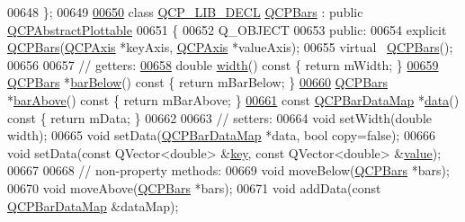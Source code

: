 \begin{DoxyCode}
00648 \};
00649 
\hypertarget{a00116_source_l00650}{}\hyperlink{a00027}{00650} \textcolor{keyword}{class }\hyperlink{a00116_a5eaab02224a642ded7fb8951e973a02c}{QCP\_LIB\_DECL} \hyperlink{a00027}{QCPBars} : \textcolor{keyword}{public} \hyperlink{a00024}{QCPAbstractPlottable}
00651 \{
00652   Q\_OBJECT
00653 \textcolor{keyword}{public}:
00654   \textcolor{keyword}{explicit} \hyperlink{a00027}{QCPBars}(\hyperlink{a00025}{QCPAxis} *keyAxis, \hyperlink{a00025}{QCPAxis} *valueAxis);
00655   \textcolor{keyword}{virtual} ~\hyperlink{a00027}{QCPBars}();
00656   
00657   \textcolor{comment}{// getters:}
\hypertarget{a00116_source_l00658}{}\hyperlink{a00027_a42798c38abd5f5db22bd45d77f429625}{00658}   \textcolor{keywordtype}{double} \hyperlink{a00027_a42798c38abd5f5db22bd45d77f429625}{width}()\textcolor{keyword}{ const }\{ \textcolor{keywordflow}{return} mWidth; \}
\hypertarget{a00116_source_l00659}{}\hyperlink{a00027_a2c46a686cbad95f180ca3c2e88263961}{00659}   \hyperlink{a00027}{QCPBars} *\hyperlink{a00027_a2c46a686cbad95f180ca3c2e88263961}{barBelow}()\textcolor{keyword}{ const }\{ \textcolor{keywordflow}{return} mBarBelow; \}
\hypertarget{a00116_source_l00660}{}\hyperlink{a00027_a9ca48a6577586825d85bdc1fbf410803}{00660}   \hyperlink{a00027}{QCPBars} *\hyperlink{a00027_a9ca48a6577586825d85bdc1fbf410803}{barAbove}()\textcolor{keyword}{ const }\{ \textcolor{keywordflow}{return} mBarAbove; \}
\hypertarget{a00116_source_l00661}{}\hyperlink{a00027_a4938c4eb29e48d4f15037886bcd4082d}{00661}   \textcolor{keyword}{const} \hyperlink{a00116_aa846c77472cae93def9f1609d0c57191}{QCPBarDataMap} *\hyperlink{a00027_a4938c4eb29e48d4f15037886bcd4082d}{data}()\textcolor{keyword}{ const }\{ \textcolor{keywordflow}{return} mData; \}
00662   
00663   \textcolor{comment}{// setters:}
00664   \textcolor{keywordtype}{void} setWidth(\textcolor{keywordtype}{double} width);
00665   \textcolor{keywordtype}{void} setData(\hyperlink{a00116_aa846c77472cae93def9f1609d0c57191}{QCPBarDataMap} *data, \textcolor{keywordtype}{bool} copy=\textcolor{keyword}{false});
00666   \textcolor{keywordtype}{void} setData(\textcolor{keyword}{const} QVector<double> &\hyperlink{a00116_a94bb892c30911cd62cba0707a5395be4}{key}, \textcolor{keyword}{const} QVector<double> &\hyperlink{a00116_aee90379adb0307effb138f4871edbc5c}{value});
00667   
00668   \textcolor{comment}{// non-property methods:}
00669   \textcolor{keywordtype}{void} moveBelow(\hyperlink{a00027}{QCPBars} *bars);
00670   \textcolor{keywordtype}{void} moveAbove(\hyperlink{a00027}{QCPBars} *bars);
00671   \textcolor{keywordtype}{void} addData(\textcolor{keyword}{const} \hyperlink{a00116_aa846c77472cae93def9f1609d0c57191}{QCPBarDataMap} &dataMap);

\end{DoxyCode}
